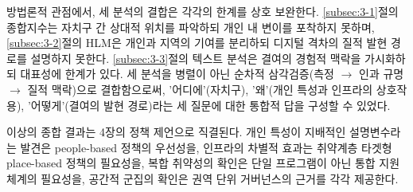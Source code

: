 방법론적 관점에서, 세 분석의 결합은 각각의 한계를 상호 보완한다. \ref{subsec:3-1}절의 종합지수는 자치구 간 상대적 위치를 파악하되 개인 내 변이를 포착하지 못하며, \ref{subsec:3-2}절의 HLM은 개인과 지역의 기여를 분리하되 디지털 격차의 질적 발현 경로를 설명하지 못한다. \ref{subsec:3-3}절의 텍스트 분석은 결여의 경험적 맥락을 가시화하되 대표성에 한계가 있다. 세 분석을 병렬이 아닌 순차적 삼각검증(측정 $\rightarrow$ 인과 규명 $\rightarrow$ 질적 맥락)으로 결합함으로써, '어디에'(자치구), '왜'(개인 특성과 인프라의 상호작용), '어떻게'(결여의 발현 경로)라는 세 질문에 대한 통합적 답을 구성할 수 있었다.

이상의 종합 결과는 4장의 정책 제언으로 직결된다. 개인 특성이 지배적인 설명변수라는 발견은 people-based 정책의 우선성을, 인프라의 차별적 효과는 취약계층 타겟형 place-based 정책의 필요성을, 복합 취약성의 확인은 단일 프로그램이 아닌 통합 지원 체계의 필요성을, 공간적 군집의 확인은 권역 단위 거버넌스의 근거를 각각 제공한다.

